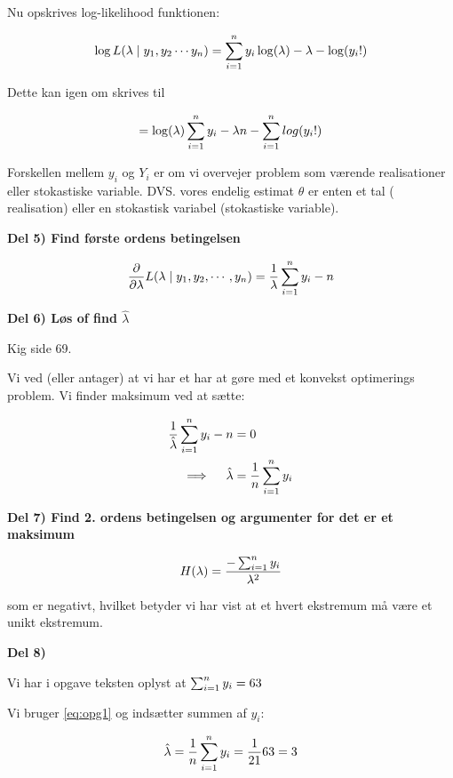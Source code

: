 Nu opskrives log-likelihood funktionen:

\begin{equation}
    \log L (\lambda \mid y_1 ,y_2 \cdots y_{n}) = \sum_{i=1}^{n} y_i \log(\lambda) - \lambda - \log(y_i !)
\end{equation}

Dette kan igen om skrives til


\begin{equation}
     = \log(\lambda) \sum_{i=1}^{n} y_i - \lambda n - \sum_{i=1}^{n} log(y_i !)
\end{equation}

Forskellen mellem $y_i$ og $Y_i$ er om vi overvejer problem som værende realisationer eller stokastiske variable. DVS. vores endelig estimat $\hat{\theta}$ er enten et tal ( realisation) eller en stokastisk variabel (stokastiske variable).

\textbf{Del 5) Find første ordens betingelsen}

\begin{equation}
    \frac{\partial }{\partial \lambda} L (\lambda \mid y_1, y_2, \cdots, y_n) = \frac{1}{\lambda} \sum_{i=1}^{n} y_i -n
\end{equation}

\textbf{Del 6) Løs of find $\hat{\lambda} $}

Kig side 69.

Vi ved (eller antager) at vi har et har at gøre med et konvekst optimerings problem. Vi finder maksimum ved at sætte:

\begin{align}
    \frac{1}{\hat{\lambda}} \sum_{i=1}^{n} y_i -n &= 0 \\
    \implies \quad \hat{\lambda} &= \frac{1}{n}\sum_{i=1}^{n} y_i
\end{align}

\textbf{Del 7) Find 2. ordens betingelsen og argumenter for det er et maksimum}

\begin{equation}\label{eq:opg1}
    H (\lambda) = \frac{- \sum_{i=1}^{n} y_i}{\lambda^2}
\end{equation}

som er negativt, hvilket betyder vi har vist at et hvert ekstremum må være et unikt ekstremum.

\textbf{Del 8)}

 Vi har i opgave teksten oplyst at $\sum_{i=1}^{n} y_i = 63$

Vi bruger \ref{eq:opg1} og indsætter summen af $y_i$:

\begin{equation}
    \hat{\lambda} = \frac{1}{n} \sum_{i=1}^{n} y_i = \frac{1}{21} 63 = 3
\end{equation}

